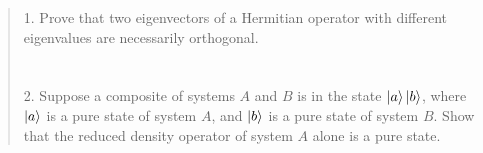 \documentclass[UTF8]{ctexart}
\begin{document}
\begin{quote}
1. Prove that two eigenvectors of a Hermitian operator with different eigenvalues are necessarily orthogonal.\\
\\
\\
2. Suppose a composite of systems $A$ and $B$ is in the state $\ket{a}\ket{b}$, 
where $\ket{a}$ is a pure state of system $A$, and $\ket{b} $ is a pure state of system $B$. 
Show that the reduced density operator of system $A$ alone is a pure state.\\
	\end{quote}
\end{document}
